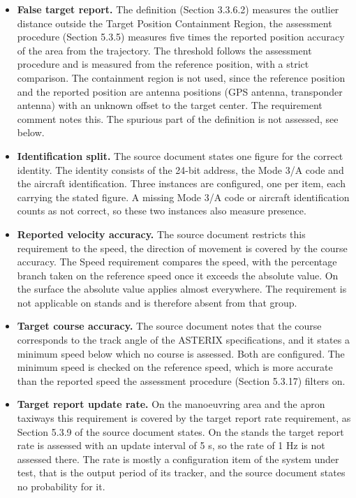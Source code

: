\begin{itemize}
\item \textbf{False target report.} The definition (Section 3.3.6.2) measures the outlier distance outside the Target Position Containment Region, the assessment procedure (Section 5.3.5) measures five times the reported position accuracy of the area from the trajectory. The threshold follows the assessment procedure and is measured from the reference position, with a strict comparison. The containment region is not used, since the reference position and the reported position are antenna positions (GPS antenna, transponder antenna) with an unknown offset to the target center. The requirement comment notes this. The spurious part of the definition is not assessed, see below.
\item \textbf{Identification split.} The source document states one figure for the correct identity. The identity consists of the 24-bit address, the Mode 3/A code and the aircraft identification. Three instances are configured, one per item, each carrying the stated figure. A missing Mode 3/A code or aircraft identification counts as not correct, so these two instances also measure presence.
\item \textbf{Reported velocity accuracy.} The source document restricts this requirement to the speed, the direction of movement is covered by the course accuracy. The Speed requirement compares the speed, with the percentage branch taken on the reference speed once it exceeds the absolute value. On the surface the absolute value applies almost everywhere. The requirement is not applicable on stands and is therefore absent from that group.
\item \textbf{Target course accuracy.} The source document notes that the course corresponds to the track angle of the ASTERIX specifications, and it states a minimum speed below which no course is assessed. Both are configured. The minimum speed is checked on the reference speed, which is more accurate than the reported speed the assessment procedure (Section 5.3.17) filters on.
\item \textbf{Target report update rate.} On the manoeuvring area and the apron taxiways this requirement is covered by the target report rate requirement, as Section 5.3.9 of the source document states. On the stands the target report rate is assessed with an update interval of 5 s, so the rate of 1 Hz is not assessed there. The rate is mostly a configuration item of the system under test, that is the output period of its tracker, and the source document states no probability for it.
\end{itemize}
\ \\

